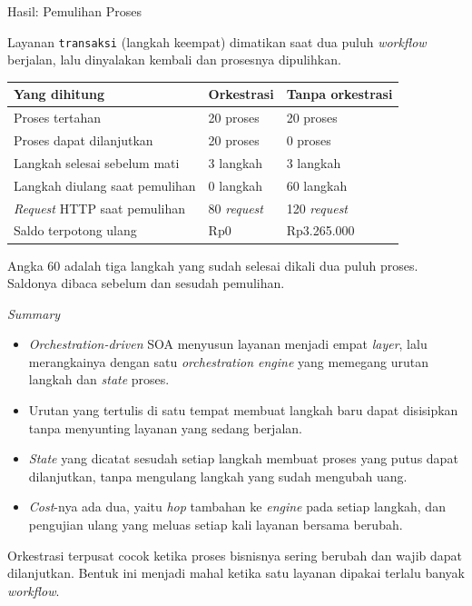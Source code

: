 \documentclass[aspectratio=169, table, 12pt]{beamer}
\begin{document}
\begin{frame}{{\Large Hasil: Pemulihan Proses}}
  \vspace{10pt}
  \raggedright
  {\small Layanan \texttt{transaksi} (langkah keempat) dimatikan saat dua puluh
  \textit{workflow} berjalan, lalu dinyalakan kembali dan prosesnya dipulihkan.}

  \vspace{4pt}
  \centering
  \small
  \begin{tabularx}{0.9\textwidth}{|X|l|l|}
    \hline
    \textbf{Yang dihitung} & \textbf{Orkestrasi} & \textbf{Tanpa orkestrasi} \\
    \hline
    Proses tertahan & 20 proses & 20 proses \\
    \hline
    Proses dapat dilanjutkan & 20 proses & 0 proses \\
    \hline
    Langkah selesai sebelum mati & 3 langkah & 3 langkah \\
    \hline
    Langkah diulang saat pemulihan & 0 langkah & 60 langkah \\
    \hline
    \textit{Request} HTTP saat pemulihan & 80 \textit{request} & 120 \textit{request} \\
    \hline
    Saldo terpotong ulang & Rp0 & Rp3.265.000 \\
    \hline
  \end{tabularx}

  \vspace{4pt}
  \raggedright
  {\small Angka 60 adalah tiga langkah yang sudah selesai dikali dua puluh
  proses. Saldonya dibaca sebelum dan sesudah pemulihan.}
\end{frame}

\begin{frame}{{\Large \textit{Summary}}}
  \vspace{12pt}
  \begin{itemize}\small
    \item \textit{Orchestration-driven} SOA menyusun layanan menjadi empat
          \textit{layer}, lalu merangkainya dengan satu \textit{orchestration
          engine} yang memegang urutan langkah dan \textit{state} proses.
    \item Urutan yang tertulis di satu tempat membuat langkah baru dapat
          disisipkan tanpa menyunting layanan yang sedang berjalan.
    \item \textit{State} yang dicatat sesudah setiap langkah membuat proses yang
          putus dapat dilanjutkan, tanpa mengulang langkah yang sudah mengubah
          uang.
    \item \textit{Cost}-nya ada dua, yaitu \textit{hop} tambahan ke
          \textit{engine} pada setiap langkah, dan pengujian ulang yang meluas
          setiap kali layanan bersama berubah.
  \end{itemize}

  \vspace{2pt}
  {\small Orkestrasi terpusat cocok ketika proses bisnisnya sering berubah dan
  wajib dapat dilanjutkan. Bentuk ini menjadi mahal ketika satu layanan dipakai
  terlalu banyak \textit{workflow}.}
\end{frame}
\end{document}
